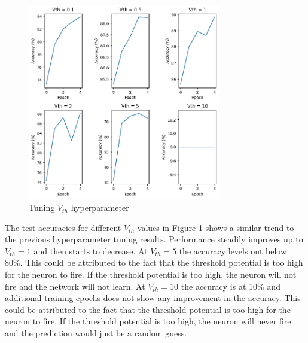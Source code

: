 \documentclass[12pt, letterpaper]{article}
\begin{document}
\begin{figure}[H]
    \centering
    \includegraphics[width=0.75\textwidth]{vth_tuning.png}
    \caption{Tuning $V_{th}$ hyperparameter}
    \label{fig:vth_tuning}
\end{figure}
The test accuracies for different $V_{th}$ values in Figure \ref{fig:vth_tuning} shows a similar trend to the previous hyperparameter tuning results. Performance steadily improves up to $V_{th} = 1$ and then starts to decrease. At $V_{th} = 5$ the accuracy levels out below 80\%. This could be attributed to the fact that the threshold potential is too high for the neuron to fire. If the threshold potential is too high, the neuron will not fire and the network will not learn. At $V_{th} = 10$ the accuracy is at 10\% and additional training epochs does not show any improvement in the accuracy. This could be attributed to the fact that the threshold potential is too high for the neuron to fire. If the threshold potential is too high, the neuron will never fire and the prediction would just be a random guess.
\end{document}
